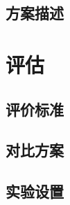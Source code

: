 \documentclass[UTF8]{ctexart}
\begin{document}
\subsection{方案描述}

\section{评估}
\subsection{评价标准}

\subsection{对比方案}

\subsection{实验设置}



\end{document}
